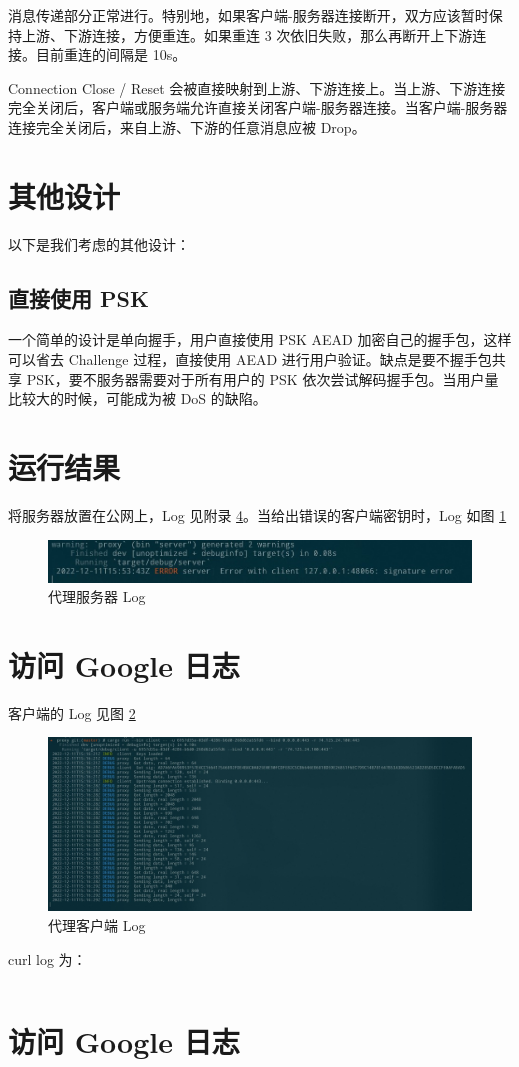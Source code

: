 \documentclass{ctexart}
\begin{document}
  消息传递部分正常进行。特别地，如果客户端-服务器连接断开，双方应该暂时保持上游、下游连接，方便重连。如果重连 3 次依旧失败，那么再断开上下游连接。目前重连的间隔是 10s。

  Connection Close / Reset 会被直接映射到上游、下游连接上。当上游、下游连接完全关闭后，客户端或服务端允许直接关闭客户端-服务器连接。当客户端-服务器连接完全关闭后，来自上游、下游的任意消息应被 Drop。

  \section{其他设计}
  以下是我们考虑的其他设计：

  \subsection{直接使用 PSK}

  一个简单的设计是单向握手，用户直接使用 PSK AEAD 加密自己的握手包，这样可以省去 Challenge 过程，直接使用 AEAD 进行用户验证。缺点是要不握手包共享 PSK，要不服务器需要对于所有用户的 PSK 依次尝试解码握手包。当用户量比较大的时候，可能成为被 DoS 的缺陷。

  \section{运行结果}

  将服务器放置在公网上，Log 见附录 \ref{result:google}。当给出错误的客户端密钥时，Log 如图 \ref{fig:wrong-cred}

  \begin{figure}
    \includegraphics[width=\textwidth]{sig.jpg}
    \caption{代理服务器 Log}
    \label{fig:wrong-cred}
  \end{figure}

  \appendix
  \section{访问 Google 日志}
  \label{result:google}

  客户端的 Log 见图 \ref{fig:client-google}

  \begin{figure}
    \includegraphics[width=\textwidth]{client-log-google.jpg}
    \caption{代理客户端 Log}
    \label{fig:client-google}
  \end{figure}

  curl log 为：

  \inputminted[]{text}{curl-log-google.txt}

  \section{访问 Google 日志}
  \label{result:google}
\end{document}
